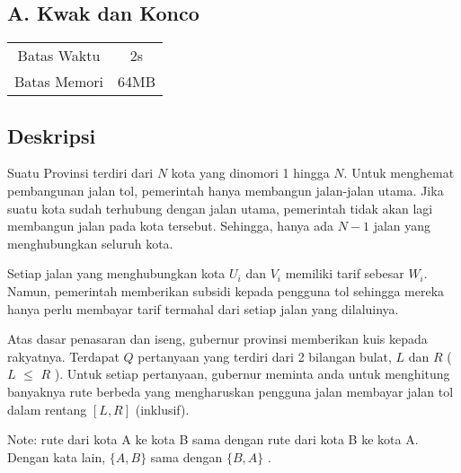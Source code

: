 \documentclass{article}
\begin{document}
\begin{center}
    \section*{A. Kwak dan Konco} %

    \begin{tabular}{ | c c | }
        \hline
        Batas Waktu  & 2s \\    %
        Batas Memori & 64MB \\  %
        \hline
    \end{tabular}
\end{center}

\subsection*{Deskripsi}



Suatu Provinsi terdiri dari $N$ kota yang dinomori 1 hingga $N$. Untuk menghemat pembangunan jalan tol, pemerintah hanya membangun jalan-jalan utama. Jika suatu kota sudah terhubung dengan jalan utama, pemerintah tidak akan lagi membangun jalan pada kota tersebut. Sehingga, hanya ada ${N-1}$ jalan yang menghubungkan seluruh kota.

Setiap jalan yang menghubungkan kota $U_i$ dan $V_i$ memiliki tarif sebesar $W_i$. Namun, pemerintah memberikan subsidi kepada pengguna tol sehingga mereka hanya perlu membayar tarif termahal dari setiap jalan yang dilaluinya.

Atas dasar penasaran dan iseng, gubernur provinsi memberikan kuis kepada rakyatnya. Terdapat $Q$ pertanyaan yang terdiri dari 2 bilangan bulat, $L$ dan $R$ ( $L$ $\leq$ $R$ ). Untuk setiap pertanyaan, gubernur meminta anda untuk menghitung banyaknya rute berbeda yang mengharuskan pengguna jalan membayar jalan tol dalam rentang $[L,R]$ (inklusif).

Note: rute dari kota A ke kota B sama dengan rute dari kota B ke kota A. Dengan kata lain, $\{A, B\}$ sama dengan $\{B, A\}$ .

\end{document}
